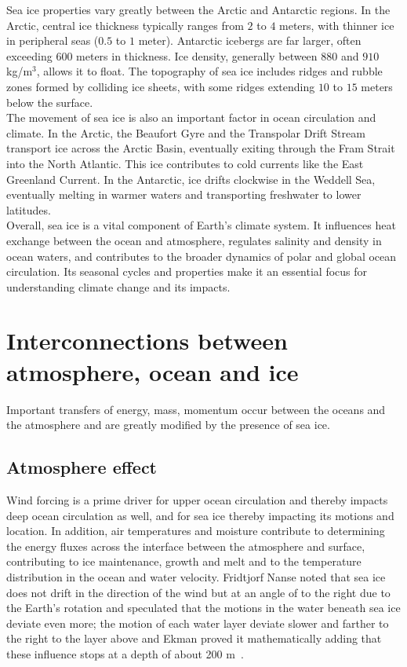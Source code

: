 Sea ice properties vary greatly between the Arctic and Antarctic regions. In the Arctic, central ice thickness typically ranges from $2$ to $4$ meters, with thinner ice in peripheral seas ($0.5$ to $1$ meter). Antarctic icebergs are far larger, often exceeding $600$ meters in thickness. Ice density, generally between $880$ and $910$ kg/m\(^3\), allows it to float. The topography of sea ice includes ridges and rubble zones formed by colliding ice sheets, with some ridges extending $10$ to $15$ meters below the surface. \\
The movement of sea ice is also an important factor in ocean circulation and climate. In the Arctic, the Beaufort Gyre and the Transpolar Drift Stream transport ice across the Arctic Basin, eventually exiting through the Fram Strait into the North Atlantic. This ice contributes to cold currents like the East Greenland Current. In the Antarctic, ice drifts clockwise in the Weddell Sea, eventually melting in warmer waters and transporting freshwater to lower latitudes. \\
[0.15 cm]

Overall, sea ice is a vital component of Earth's climate system. It influences heat exchange between the ocean and atmosphere, regulates salinity and density in ocean waters, and contributes to the broader dynamics of polar and global ocean circulation. Its seasonal cycles and properties make it an essential focus for understanding climate change and its impacts.

\section{Interconnections between atmosphere, ocean and ice}\label{sec:atm-ocean-ice-interconnections}
Important transfers of energy, mass, momentum occur between the oceans and the atmosphere and are greatly modified by the presence of sea ice.

\subsection{Atmosphere effect}\label{subsec:atmosphere-interconnections}

Wind forcing is a prime driver for upper ocean circulation and thereby impacts deep ocean circulation as well, and for sea ice thereby impacting its motions and location. In addition, air temperatures and moisture contribute to determining the energy fluxes across the interface between the atmosphere and surface, contributing to ice maintenance, growth and melt and to the temperature distribution in the ocean and water velocity.
Fridtjorf Nanse noted that sea ice does not drift in the direction of the wind but at an angle of to the right due to the Earth’s rotation and speculated that the motions in the water beneath sea ice deviate even more; the motion of each water layer deviate slower and farther to the right to the layer above and Ekman proved it mathematically adding that these influence stops at a depth of about 200 m~\citep[see e.g. Section 3.1 of][]{Zanotti2023}.

